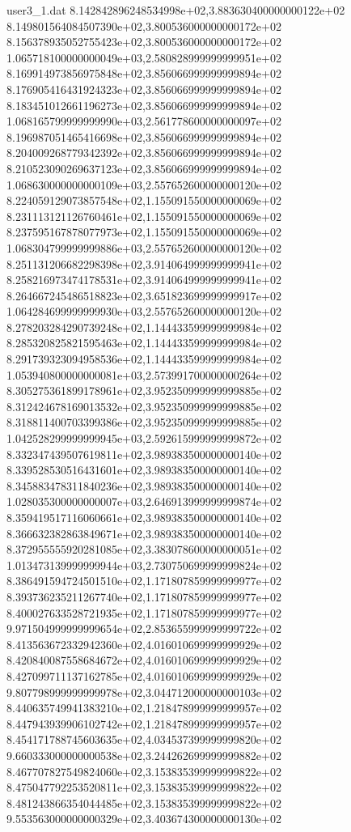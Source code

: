\begin{filecontents}{user3_1.dat}
8.142842896248534998e+02,3.883630400000000122e+02
8.149801564084507390e+02,3.800536000000000172e+02
8.156378935052755423e+02,3.800536000000000172e+02
1.065718100000000049e+03,2.580828999999999951e+02
8.169914973856975848e+02,3.856066999999999894e+02
8.176905416431924323e+02,3.856066999999999894e+02
8.183451012661196273e+02,3.856066999999999894e+02
1.068165799999999990e+03,2.561778600000000097e+02
8.196987051465416698e+02,3.856066999999999894e+02
8.204009268779342392e+02,3.856066999999999894e+02
8.210523090269637123e+02,3.856066999999999894e+02
1.068630000000000109e+03,2.557652600000000120e+02
8.224059129073857548e+02,1.155091550000000069e+02
8.231113121126760461e+02,1.155091550000000069e+02
8.237595167878077973e+02,1.155091550000000069e+02
1.068304799999999886e+03,2.557652600000000120e+02
8.251131206682298398e+02,3.914064999999999941e+02
8.258216973474178531e+02,3.914064999999999941e+02
8.264667245486518823e+02,3.651823699999999917e+02
1.064284699999999930e+03,2.557652600000000120e+02
8.278203284290739248e+02,1.144433599999999984e+02
8.285320825821595463e+02,1.144433599999999984e+02
8.291739323094958536e+02,1.144433599999999984e+02
1.053940800000000081e+03,2.573991700000000264e+02
8.305275361899178961e+02,3.952350999999999885e+02
8.312424678169013532e+02,3.952350999999999885e+02
8.318811400703399386e+02,3.952350999999999885e+02
1.042528299999999945e+03,2.592615999999999872e+02
8.332347439507619811e+02,3.989383500000000140e+02
8.339528530516431601e+02,3.989383500000000140e+02
8.345883478311840236e+02,3.989383500000000140e+02
1.028035300000000007e+03,2.646913999999999874e+02
8.359419517116060661e+02,3.989383500000000140e+02
8.366632382863849671e+02,3.989383500000000140e+02
8.372955555920281085e+02,3.383078600000000051e+02
1.013473139999999944e+03,2.730750699999999824e+02
8.386491594724501510e+02,1.171807859999999977e+02
8.393736235211267740e+02,1.171807859999999977e+02
8.400027633528721935e+02,1.171807859999999977e+02
9.971504999999999654e+02,2.853655999999999722e+02
8.413563672332942360e+02,4.016010699999999929e+02
8.420840087558684672e+02,4.016010699999999929e+02
8.427099711137162785e+02,4.016010699999999929e+02
9.807798999999999978e+02,3.044712000000000103e+02
8.440635749941383210e+02,1.218478999999999957e+02
8.447943939906102742e+02,1.218478999999999957e+02
8.454171788745603635e+02,4.034537399999999820e+02
9.660333000000000538e+02,3.244262699999999882e+02
8.467707827549824060e+02,3.153835399999999822e+02
8.475047792253520811e+02,3.153835399999999822e+02
8.481243866354044485e+02,3.153835399999999822e+02
9.553563000000000329e+02,3.403674300000000130e+02

\end{filecontents}
